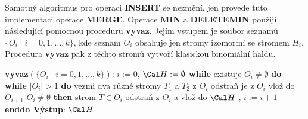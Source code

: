 \documentclass[a4paper,12pt]{article}
\begin{document}
Samotný algoritmus pro operaci {\bf INSERT} se nezmění, jen 
provede tuto implementaci ope\-race {\bf MER\-GE}.  Ope\-race 
{\bf MIN} a {\bf DELETE\-MIN} použijí následující pomocnou 
proceduru {\bf vyvaz}.  Jejím vstu\-pem je soubor 
seznamů $\{O_i\mid i=0,1,\dots,k\}$, kde seznam $O_i$ 
obsahuje jen stromy izomorfní se stromem $H_i$.  
Procedura {\bf vyvaz} pak z těchto stromů vytvoří 
klasickou binomiální hal\-du. 

{\bf vyvaz$(\{O_i\mid i=0,1,\dots,k\})$}:\newline 
$i:=0$, $\Cal H:=\emptyset$\newline 
{\bf while} existuje $O_i\ne\emptyset$ {\bf do\newline 
\phantom{{\rm ---}}while} $|O_i|>1$ {\bf do\newline 
\phantom{{\rm ------}}}vezmi dva různé stromy $T_1$ a $
T_2$ z 
$O_i$\newline 
\phantom{------}odstraň je z $O_i$\newline 
\phantom{------}{\bf spoj$(T_1,T_2)$} vlož do $O_{i+1}$\newline 
{} $O_i\ne\emptyset$ {\bf then\newline 
\phantom{{\rm ------}}}strom $T\in O_i$ odstraň z $O_i$ a vlož do $
\Cal H$\newline 
\phantom{---}{\bf endif},\newline 
\phantom{---}$i:=i+1$\newline 
{\bf enddo\newline 
Výstup}: $\Cal H$
\end{document}
